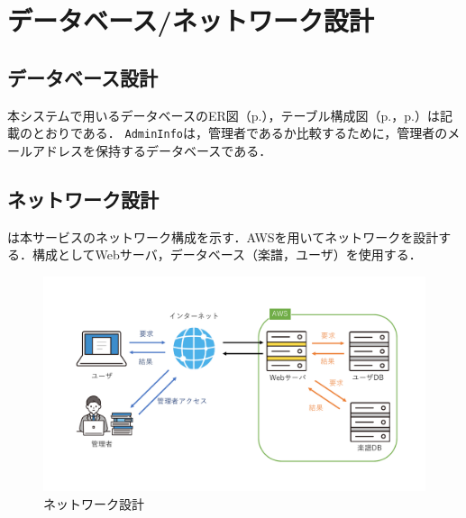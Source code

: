 \chapter{データベース/ネットワーク設計}
\section*{データベース設計}
本システムで用いるデータベースのER図（p.\pageref{fig:ER図}），テーブル構成図（p.\pageref{tableDesgin1}，p.\pageref{tableDesgin2}）は記載のとおりである．
\texttt{AdminInfo}は，管理者であるか比較するために，管理者のメールアドレスを保持するデータベースである．
\section*{ネットワーク設計}
は本サービスのネットワーク構成を示す．AWSを用いてネットワークを設計する．構成としてWebサーバ，データベース（楽譜，ユーザ）を使用する．
\begin{figure}[b]
    \centering
    \includegraphics[keepaspectratio,width=.8\textwidth]{db-nwDesign/networkDesign.pdf}
    \caption{ネットワーク設計}\label{fig:ネットワーク設計}
\end{figure}
